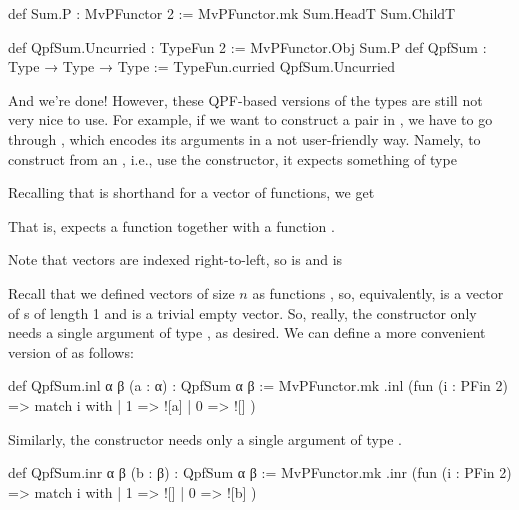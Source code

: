 \begin{leancode}
    def Sum.P  : MvPFunctor 2 := MvPFunctor.mk Sum.HeadT  Sum.ChildT
    
    def QpfSum.Uncurried : TypeFun 2 := MvPFunctor.Obj Sum.P
    def QpfSum : Type → Type → Type  := TypeFun.curried QpfSum.Uncurried
\end{leancode}

And we're done! However, these QPF-based versions of the types are still not very nice to use.
For example, if we want to construct a pair in , we have to go through ,
which encodes its arguments in a not user-friendly way. 
Namely, to construct  from an , i.e., use the  constructor, 
it expects something of type
\begin{center}
\end{center}
Recalling that  is shorthand for a vector of functions, we get
\begin{center}
\end{center}
That is,  expects a function  together with a function .
\begin{remark}
    Note that vectors are indexed right-to-left, so  is 
    and  is 
\end{remark}

Recall that we defined vectors of size $n$ as functions , so, equivalently,  is a vector of s of length 1 and  is a trivial empty vector. So, really, the  constructor only needs a single argument of type , as desired. We can define a more convenient version of  as follows:

\begin{leancode}
    def QpfSum.inl {α β} (a : α) : QpfSum α β :=
      MvPFunctor.mk .inl (fun (i : PFin 2) => match i with
        | 1 => ![a]
        | 0 => ![]
      )
\end{leancode}

Similarly, the  constructor needs only a single argument of type .

\begin{leancode}
    def QpfSum.inr {α β} (b : β) : QpfSum α β :=
      MvPFunctor.mk .inr (fun (i : PFin 2) => match i with
        | 1 => ![]
        | 0 => ![b]
      )
\end{leancode}

